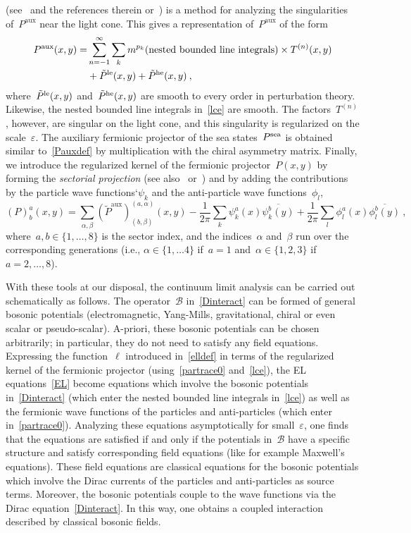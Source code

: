\documentclass[reqno,11pt]{amsart}
\numberwithin{equation}{section}
\newcommand{\beq}{\begin{equation}}
\newcommand{\eeq}{\end{equation}}
\newcommand{\1}{\mbox{\rm 1 \hspace{-1.05 em} 1}}
\newcommand{\B}{{\mathscr{B}}}
\newcommand{\sea}{\text{\rm{sea}}}
\newcommand{\lec}{\text{\rm{le}}}
\newcommand{\hec}{\text{\rm{he}}}
\begin{document}
(see~\cite[Section~2.5]{pfp} and the references therein or~\cite[Section~2.2]{cfs}) is a method for analyzing
the singularities of~$P^\text{aux}$ near the light cone. This gives a representation of~$P^\text{aux}$
of the form
\beq \begin{split}  \label{lce}
P^\text{aux}(x,y) = & \sum_{n=-1}^\infty
\sum_{k} m^{p_k} 
{\text{(nested bounded line integrals)}} \times  T^{(n)}(x,y) \\
&+ \tilde{P}^\lec(x,y) + \tilde{P}^\hec(x,y) \:,
\end{split}
\eeq
where~$\tilde{P}^\lec(x,y)$ and~$\tilde{P}^\hec(x,y)$ are smooth to every order in perturbation theory.
Likewise, the nested bounded line integrals in~\eqref{lce} are smooth.
The factors~$T^{(n)}$, however, are singular on the light cone, and this singularity is regularized on the
scale~$\varepsilon$.
The auxiliary fermionic projector of the sea states~$P^\sea$ is obtained similar to~\eqref{Pauxdef} by
multiplication with the chiral asymmetry matrix.
Finally, we introduce the regularized kernel of the fermionic projector~$P(x,y)$ by forming the {\em{sectorial projection}} (see also~\cite[Section~2.3]{pfp} or~\cite[\S5.2.1]{cfs})
and by adding the contributions by the particle wave functions`$\psi_k$ and the anti-particle wave
functions~$\phi_l$,
\beq \label{partrace0}
(P)^a_b(x,y) = \sum_{\alpha, \beta} (\tilde{P}^\text{aux})^{(a,\alpha)}_{(b, \beta)}(x,y) 
-\frac{1}{2 \pi} \sum_k \psi^a_k(x) \overline{\psi^b_k(y)}
+\frac{1}{2 \pi} \sum_l \phi^a_l(x) \overline{\phi^b_l(y)}\:,
\eeq
where~$a,b \in \{1, \ldots, 8\}$ is the sector index, and the indices~$\alpha$ and~$\beta$ run over
the corresponding generations (i.e., $\alpha \in \{1, \ldots 4\}$ if~$a=1$ and~$\alpha \in \{1, 2, 3 \}$
if~$a=2, \ldots, 8$).

With these tools at our disposal, the continuum limit analysis can be carried out schematically as follows.
The operator~$\B$ in~\eqref{Dinteract} can be formed of general bosonic potentials
(electromagnetic, Yang-Mills, gravitational, chiral or even scalar or pseudo-scalar).
A-priori, these bosonic potentials can be chosen arbitrarily; in particular, they
do not need to satisfy any field equations.
Expressing the function~$\ell$ introduced in~\eqref{elldef} in terms of the regularized
kernel of the fermionic projector (using~\eqref{partrace0} and~\eqref{lce}),
the EL equations~\eqref{EL} become equations which involve the bosonic potentials
in~\eqref{Dinteract} (which enter the nested bounded line integrals in~\eqref{lce})
as well as the fermionic wave functions of the particles and anti-particles
(which enter in~\eqref{partrace0}).
Analyzing these equations asymptotically for small~$\varepsilon$, one finds that
the equations are satisfied if and only if the potentials in~$\B$ have a specific structure
and satisfy corresponding field equations (like for example Maxwell's equations).
These field equations are classical equations
for the bosonic potentials which involve the Dirac currents of the particles and anti-particles
as source terms. Moreover, the bosonic potentials couple to the wave functions
via the Dirac equation~\eqref{Dinteract}. In this way, one obtains a coupled interaction
described by classical bosonic fields.
\end{document}
